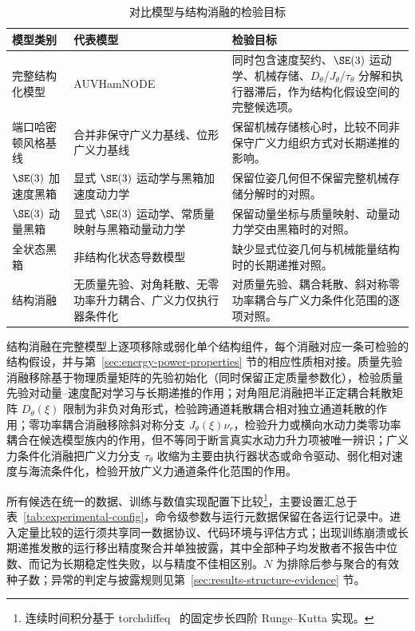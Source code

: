 \begin{table}[htbp]
  \centering
  \caption{对比模型与结构消融的检验目标}
  \label{tab:model-comparison-roles}
  \begin{tabularx}{\textwidth}{>{\raggedright\arraybackslash}p{}>{\raggedright\arraybackslash}p{}>{\raggedright\arraybackslash}X}
    \toprule
    模型类别 & 代表模型 & 检验目标 \\
    \midrule
    完整结构化模型 & AUVHamNODE & 同时包含速度契约、\(\SE(3)\) 运动学、机械存储、\(D_\theta\)/\(J_\theta\)/\(\tau_\theta\) 分解和执行器滞后，作为结构化假设空间的完整候选项。 \\
    端口哈密顿风格基线 & 合并非保守广义力基线、位形广义力基线 & 保留机械存储核心时，比较不同非保守广义力组织方式对长期递推的影响。 \\
    \(\SE(3)\) 加速度黑箱 & 显式 \(\SE(3)\) 运动学与黑箱加速度动力学 & 保留位姿几何但不保留完整机械存储分解时的对照。 \\
    \(\SE(3)\) 动量黑箱 & 显式 \(\SE(3)\) 运动学、常质量映射与黑箱动量动力学 & 保留动量坐标与质量映射、动量动力学交由黑箱时的对照。 \\
    全状态黑箱 & 非结构化状态导数模型 & 缺少显式位姿几何与机械能量结构时的长期递推对照。 \\
    结构消融 & 无质量先验、对角耗散、无零功率升力耦合、广义力仅执行器条件化 & 对质量先验、耦合耗散、斜对称零功率耦合与广义力条件化范围的逐项对照。 \\
    \bottomrule
  \end{tabularx}
\end{table}

结构消融在完整模型上逐项移除或弱化单个结构组件，每个消融对应一条可检验的结构假设，并与第~\ref{sec:energy-power-properties} 节的相应性质相对接。质量先验消融移除基于物理质量矩阵的先验初始化（同时保留正定质量参数化），检验质量先验对动量--速度配对学习与长期递推的作用；对角阻尼消融把半正定耦合耗散矩阵 \(D_\theta(\xi)\) 限制为非负对角形式，检验跨通道耗散耦合相对独立通道耗散的作用；零功率耦合消融移除斜对称分支 \(J_\theta(\xi)\nu_r\)，检验升力或横向水动力类零功率耦合在候选模型族内的作用，但不等同于断言真实水动力升力项被唯一辨识；广义力条件化消融把广义力分支 \(\tau_\theta\) 收缩为主要由执行器状态或命令驱动、弱化相对速度与海流条件化，检验开放广义力通道条件化范围的作用。

所有候选在统一的数据、训练与数值实现配置下比较\footnote{连续时间积分基于 torchdiffeq~\citep{chen2018neuralode} 的固定步长四阶 Runge--Kutta 实现。}，主要设置汇总于表~\ref{tab:experimental-config}，命令级参数与运行元数据保留在各运行记录中。进入定量比较的运行须共享同一数据协议、代码环境与评估方式；出现训练崩溃或长期递推发散的运行移出精度聚合并单独披露，其中全部种子均发散者不报告中位数、而记为长期稳定性失败，以与精度不佳相区别。\(N\) 为排除后参与聚合的有效种子数；异常的判定与披露规则见第~\ref{sec:results-structure-evidence} 节。

